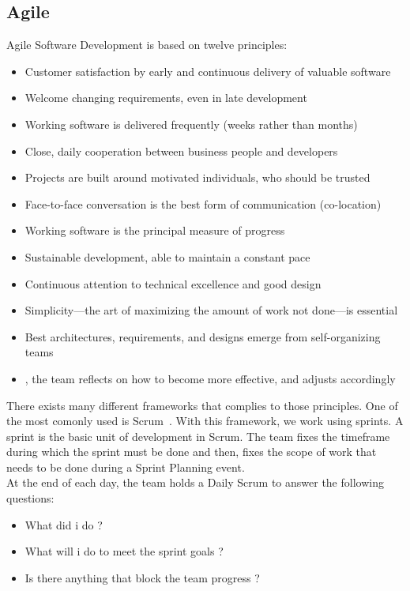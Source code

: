 \documentclass[12pt]{article}
\begin{document}
\subsection{Agile}

Agile Software Development is based on twelve principles:

\begin{itemize}

\item Customer satisfaction by early and continuous delivery of valuable software
\item Welcome changing requirements, even in late development
\item Working software is delivered frequently (weeks rather than months)
\item Close, daily cooperation between business people and developers
\item Projects are built around motivated individuals, who should be trusted
\item Face-to-face conversation is the best form of communication (co-location)
\item Working software is the principal measure of progress
\item Sustainable development, able to maintain a constant pace
\item Continuous attention to technical excellence and good design
\item Simplicity—the art of maximizing the amount of work not done—is essential
\item Best architectures, requirements, and designs emerge from self-organizing teams
\item , the team reflects on how to become more effective, and adjusts accordingly

\end{itemize}

There exists many different frameworks that complies to those principles. One of the most comonly used is Scrum~\cite{ScrumAlliance:2017}. With this framework, we work using sprints. A sprint is the basic unit of development in Scrum. The team fixes the timeframe during which the sprint must be done and then, fixes the scope of work that needs to be done during a Sprint Planning event.\\

At the end of each day, the team holds a Daily Scrum to answer the following questions:

\begin{itemize}

\item What did i do ?
\item What will i do to meet the sprint goals ?
\item Is there anything that block the team progress ?

\end{itemize}
\end{document}
